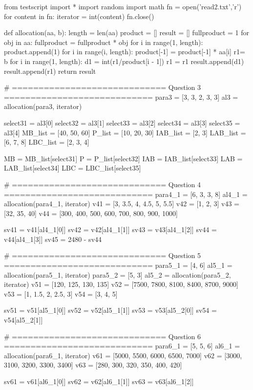 \documentclass[a4paper,11pt]{article}
\begin{document}
\begin{pycode}
	from testscript import *
	import random
	import math
	fn = open('read2.txt','r')
	for content in fn:
		iterator = int(content)
	fn.close()
	
	def allocation(aa, b):
		length = len(aa)
		product = []
		result = []
		fullproduct = 1
		for obj in aa:
			fullproduct = fullproduct * obj
		for i in range(1, length):
			product.append(1)
			for i in range(i, length):
				product[-1] = product[-1] * aa[i]
		r1= b%
		for i in range(1, length):
			d1 = int(r1/product[i - 1])
			r1 = r1%
			result.append(d1)
		result.append(r1)
		return result
	
	# ============================= Question 3 ============================
	para3 = [3, 3, 2, 3, 3]
	al3 = allocation(para3, iterator)
		
	select31 = al3[0]
	select32 = al3[1]
	select33 = al3[2]
	select34 = al3[3]
	select35 = al3[4]
	MB_list = [40, 50, 60]
	P_list = [10, 20, 30]
	IAB_list = [2, 3]
	LAB_list = [6, 7, 8]
	LBC_list = [2, 3, 4]
	
	MB = MB_list[select31]
	P = P_list[select32]
	IAB = IAB_list[select33]
	LAB = LAB_list[select34]
	LBC = LBC_list[select35]
	
	# ============================= Question 4 ============================
	para4_1 = [6, 3, 3, 8]
	al4_1 = allocation(para4_1, iterator)
	v41 = [3, 3.5, 4, 4.5, 5, 5.5]
	v42 = [1, 2, 3]
	v43 = [32, 35, 40]
	v44 = [300, 400, 500, 600, 700, 800, 900, 1000]
	
	sv41 = v41[al4_1[0]]
	sv42 = v42[al4_1[1]]
	sv43 = v43[al4_1[2]]
	sv44 = v44[al4_1[3]]
	sv45 = 2480 - sv44
	
	# ============================= Question 5 ============================
	para5_1 = [4, 6]
	al5_1 = allocation(para5_1, iterator)
	para5_2 = [5, 3]
	al5_2 = allocation(para5_2, iterator)
	v51 = [120, 125, 130, 135]
	v52 = [7500, 7800, 8100, 8400, 8700, 9000]
	v53 = [1, 1.5, 2, 2.5, 3]
	v54 = [3, 4, 5]
	
	sv51 = v51[al5_1[0]]
	sv52 = v52[al5_1[1]]
	sv53 = v53[al5_2[0]]
	sv54 = v54[al5_2[1]]
	
	# ============================= Question 6 ============================
	para6_1 = [5, 5, 6]
	al6_1 = allocation(para6_1, iterator)
	v61 = [5000, 5500, 6000, 6500, 7000]
	v62 = [3000, 3100, 3200, 3300, 3400]
	v63 = [280, 300, 320, 350, 400, 420]
	
	sv61 = v61[al6_1[0]]
	sv62 = v62[al6_1[1]]
	sv63 = v63[al6_1[2]]
	

\end{pycode}
\end{document}

